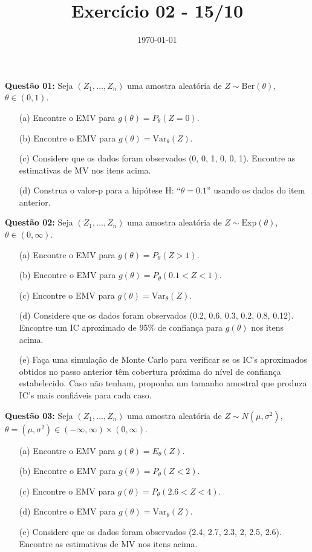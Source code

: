 \documentclass[a4paper]{article}
\date{\today}
\title{Exercício 02 - 15/10}
\begin{document}
    \header{}

\textbf{Questão 01:}  
Seja $(Z_1, \ldots, Z_n)$ uma amostra aleatória de $Z \sim \text{Ber}(\theta)$, $\theta \in (0,1)$.
\begin{itemize}
  \item[(a)] Encontre o EMV para $g(\theta) = P_\theta(Z = 0)$.
  \item[(b)] Encontre o EMV para $g(\theta) = \mathrm{Var}_\theta(Z)$.
  \item[(c)] Considere que os dados foram observados (0, 0, 1, 0, 0, 1). Encontre as estimativas de MV nos itens acima.
  \item[(d)] Construa o valor-p para a hipótese H: ``$\theta = 0.1$'' usando os dados do item anterior.
\end{itemize}
    \begin{answer}[]
%  
    \end{answer}

\textbf{Questão 02:}  
Seja $(Z_1, \ldots, Z_n)$ uma amostra aleatória de $Z \sim \text{Exp}(\theta)$, $\theta \in (0,\infty)$.
\begin{itemize}
  \item[(a)] Encontre o EMV para $g(\theta) = P_\theta(Z > 1)$.
  \item[(b)] Encontre o EMV para $g(\theta) = P_\theta(0.1 < Z < 1)$.
  \item[(c)] Encontre o EMV para $g(\theta) = \mathrm{Var}_\theta(Z)$.
  \item[(d)] Considere que os dados foram observados (0.2, 0.6, 0.3, 0.2, 0.8, 0.12). Encontre um IC aproximado de 95\% de confiança para $g(\theta)$ nos itens acima.
  \item[(e)] Faça uma simulação de Monte Carlo para verificar se os IC's aproximados obtidos no passo anterior têm cobertura próxima do nível de confiança estabelecido. Caso não tenham, proponha um tamanho amostral que produza IC's mais confiáveis para cada caso.
\end{itemize}

    \begin{answer}[]

    \end{answer}

\textbf{Questão 03:}  
Seja $(Z_1, \ldots, Z_n)$ uma amostra aleatória de $Z \sim N(\mu, \sigma^2)$, $\theta = (\mu, \sigma^2) \in (-\infty,\infty) \times (0,\infty)$.
\begin{itemize}
  \item[(a)] Encontre o EMV para $g(\theta) = E_\theta(Z)$.
  \item[(b)] Encontre o EMV para $g(\theta) = P_\theta(Z < 2)$.
  \item[(c)] Encontre o EMV para $g(\theta) = P_\theta(2.6 < Z < 4)$.
  \item[(d)] Encontre o EMV para $g(\theta) = \mathrm{Var}_\theta(Z)$.
  \item[(e)] Considere que os dados foram observados (2.4, 2.7, 2.3, 2, 2.5, 2.6). Encontre as estimativas de MV nos itens acima.
\end{itemize}
\end{document}
